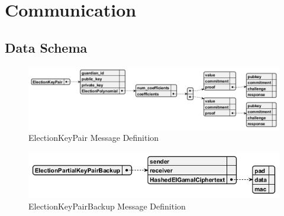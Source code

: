 \section{Communication}

\subsection{Data Schema}

\begin{figure}
    \centering
    \includegraphics[width=1\textwidth]{abbildungen/Diagramme/mElectionKeyPair.png}
    \caption{ElectionKeyPair Message Definition}
    \label{Fig:keypair}
\end{figure}

\begin{figure}
    \centering
    \includegraphics[width=1\textwidth]{abbildungen/Diagramme/mElectionPartialKeyPairBackup.png}
    \caption{ElectionKeyPairBackup Message Definition}
    \label{Fig:backup}
\end{figure}

